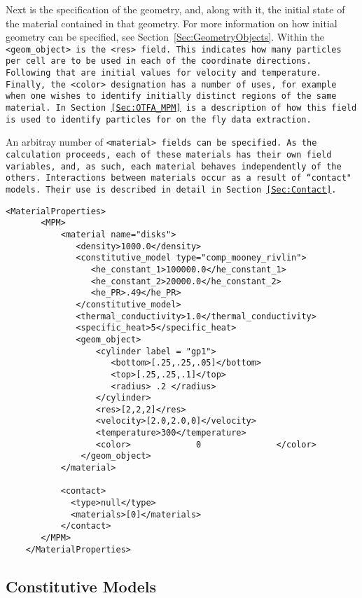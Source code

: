 Next is the specification of the geometry, and, along with it, the initial
state of the material contained in that geometry.  For more information on
how initial geometry can be specified, see Section~\ref{Sec:GeometryObjects}.  Within the
\tt <geom\_object> \normalfont is the \tt <res> \normalfont field.  This
indicates how many particles per cell are to be used in each of the 
coordinate directions.  Following that are initial values for velocity and
temperature.  Finally, the \tt <color> \normalfont designation has a number
of uses, for example when one wishes to identify initially distinct regions
of the same material.  In Section~\ref{Sec:OTFA_MPM} is a description of how
this field is used to identify particles for on the fly data extraction.

An arbitray number of \tt <material> \normalfont fields can be specified.
As the calculation proceeds, each of these materials has their own field
variables, and, as such, each material behaves independently of the others.
Interactions between materials occur as a result of ``contact" models.
Their use is described in detail in Section~\ref{Sec:Contact}.

\begin{Verbatim}[fontsize=\footnotesize]
    <MaterialProperties>
       <MPM>
           <material name="disks">
              <density>1000.0</density>
              <constitutive_model type="comp_mooney_rivlin">
                 <he_constant_1>100000.0</he_constant_1>
                 <he_constant_2>20000.0</he_constant_2>
                 <he_PR>.49</he_PR>
              </constitutive_model>
              <thermal_conductivity>1.0</thermal_conductivity>
              <specific_heat>5</specific_heat>
              <geom_object>
                  <cylinder label = "gp1">
                     <bottom>[.25,.25,.05]</bottom>
                     <top>[.25,.25,.1]</top>
                     <radius> .2 </radius>
                  </cylinder>
                  <res>[2,2,2]</res>
                  <velocity>[2.0,2.0,0]</velocity>
                  <temperature>300</temperature>
                  <color>             0               </color>
               </geom_object>
           </material>

           <contact>
             <type>null</type>
             <materials>[0]</materials>
           </contact>
       </MPM>
    </MaterialProperties>
\end{Verbatim}

\subsection{Constitutive Models} \label{Sec:ConstitutiveModels}

